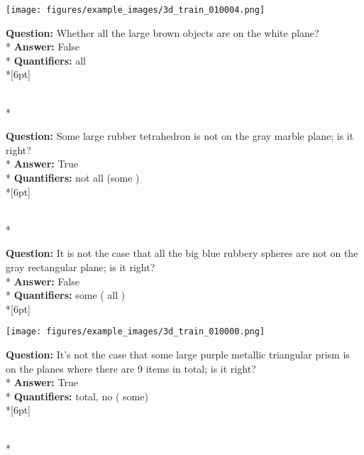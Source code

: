 \begin{figure*}
\begin{minipage}{0.48\textwidth}
    \texttt{[image: figures/example\_images/3d\_train\_010004.png]}
    \begin{minipage}[t][2.2cm][t]{1\textwidth}
      \footnotesize
      \textbf{Question:} Whether all the large brown objects are on the white plane? \\*
      \textbf{Answer:} False \\*
      \textbf{Quantifiers:} all  \\*[6pt]
    \end{minipage}\\*
    \begin{minipage}[t][2.2cm][t]{1\textwidth}
      \footnotesize
      \textbf{Question:} Some large rubber tetrahedron is not on the gray marble plane; is it right? \\*
      \textbf{Answer:} True \\*
      \textbf{Quantifiers:} not all (some )  \\*[6pt]
    \end{minipage}\\*
    \begin{minipage}[t][2.2cm][t]{1\textwidth}
      \footnotesize
      \textbf{Question:} It is not the case that all the big blue rubbery spheres are not on the gray rectangular plane; is it right? \\*
      \textbf{Answer:} False \\*
      \textbf{Quantifiers:} some ( all ) \\*[6pt]
    \end{minipage}
  \end{minipage}
  \hspace{3.5mm}
  \begin{minipage}{0.48\textwidth}
    \texttt{[image: figures/example\_images/3d\_train\_010000.png]}
    \begin{minipage}[t][2.2cm][t]{1\textwidth}
      \footnotesize
      \textbf{Question:} It's not the case that some large purple metallic triangular prism is on the planes where there are 9 items in total; is it right? \\*
      \textbf{Answer:} True \\*
      \textbf{Quantifiers:} total, no ( some)  \\*[6pt]
    \end{minipage}\\*
    \begin{minipage}[t][2.2cm][t]{1\textwidth}

\end{minipage}
\end{minipage}
\end{figure*}
